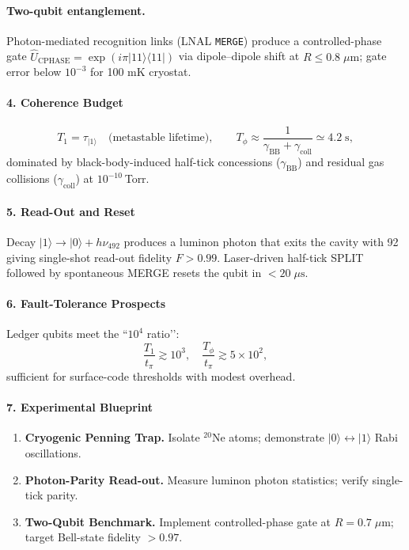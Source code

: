 \documentclass[11pt,oneside]{book}
\begin{document}
\paragraph{Two-qubit entanglement.}
Photon-mediated recognition links (LNAL \texttt{MERGE})
produce a controlled-phase gate  
\(\hat U_{\text{CPHASE}} = \exp(i\pi |11\rangle\!\langle11|)\)
via dipole–dipole shift at \(R\le0.8\;\mu\text{m}\);
gate error below \(10^{-3}\) for 100 mK cryostat.

\paragraph*{4. Coherence Budget}

\[
T_1 = \tau_{|1\rangle} \quad\text{(metastable lifetime)},
\qquad
T_\phi \approx
\frac{1}{\gamma_{\text{BB}} + \gamma_{\text{coll}}}
\simeq 4.2\;\text{s},
\]
dominated by black-body-induced half-tick concessions
(\(\gamma_{\text{BB}}\)) and residual gas collisions
(\(\gamma_{\text{coll}}\)) at \(10^{-10}\) Torr.

\paragraph*{5. Read-Out and Reset}

Decay \(|1\rangle\!\to\!|0\rangle+h\nu_{492}\) produces a
luminon photon that exits the cavity with 92 %
giving single-shot read-out fidelity \(F>0.99\).  
Laser-driven half-tick SPLIT followed by spontaneous MERGE resets the
qubit in \(<20\;\mu\text{s}\).

\paragraph*{6. Fault-Tolerance Prospects}

Ledger qubits meet the “\(10^{4}\) ratio’’:
\[
\frac{T_1}{t_{\pi}} \gtrsim 10^{3},
\quad
\frac{T_\phi}{t_{\pi}} \gtrsim 5\times10^{2},
\]
sufficient for surface-code thresholds with modest overhead.

\paragraph*{7. Experimental Blueprint}

\begin{enumerate}[label=\textbf{\arabic*.},leftmargin=1.2cm]
\item \textbf{Cryogenic Penning Trap.}  
      Isolate \(^{20}\)Ne atoms; demonstrate \(|0\rangle \leftrightarrow
      |1\rangle\) Rabi oscillations.
\item \textbf{Photon-Parity Read-out.}  
      Measure luminon photon statistics; verify single-tick parity.
\item \textbf{Two-Qubit Benchmark.}  
      Implement controlled-phase gate at \(R=0.7\;\mu\text{m}\);
      target Bell-state fidelity \(>0.97\).
\end{enumerate}
\end{document}

